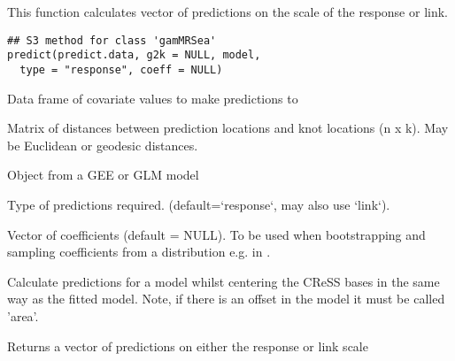 \documentclass[a4paper]{book}
\begin{document}
%
\begin{Description}\relax
This function calculates vector of predictions on the scale of the response or link.
\end{Description}
%
\begin{Usage}
\begin{verbatim}
## S3 method for class 'gamMRSea'
predict(predict.data, g2k = NULL, model,
  type = "response", coeff = NULL)
\end{verbatim}
\end{Usage}
%
\begin{Arguments}
\begin{ldescription}
\item[\code{predict.data}] Data frame of covariate values to make predictions to

\item[\code{g2k}] Matrix of distances between prediction locations and knot locations (n x k). May be Euclidean or geodesic distances.

\item[\code{model}] Object from a GEE or GLM model

\item[\code{type}] Type of predictions required. (default=`response`, may also use `link`).

\item[\code{coeff}] Vector of coefficients (default = NULL). To be used when bootstrapping and sampling coefficients from a distribution e.g. in .
\end{ldescription}
\end{Arguments}
%
\begin{Details}\relax
Calculate predictions for a model whilst centering the CReSS bases in the same way as the fitted model. Note, if there is an offset in the model it must be called 'area'.
\end{Details}
%
\begin{Value}
Returns a vector of predictions on either the response or link scale
\end{Value}
%
\end{document}
